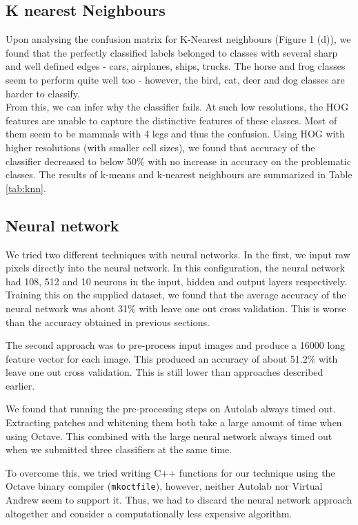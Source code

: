 \documentclass{article} %
\begin{document}
\subsection{K nearest Neighbours}
    Upon analysing the confusion matrix for K-Nearest neighbours (Figure 1 (d)), we found that the perfectly classified labels belonged to classes with several sharp and well defined edges - cars, airplanes, ships, trucks. The horse and frog classes seem to perform quite well too - however, the bird, cat, deer and dog classes are harder to classify.\\

        From this, we can infer why the classifier fails. At such low resolutions, the HOG features are unable to capture the distinctive features of these classes. Most of them seem to be mammals with 4 legs and thus the confusion. Using HOG with higher resolutions (with smaller cell sizes), we found that accuracy of the classifier decreased to below 50\% with no increase in accuracy on the problematic classes. The results of k-means and k-nearest neighbours are summarized in Table \ref{tab:knn}.
        
    \subsection{Neural network} %
    \label{sub:Results}
        We tried two different techniques with neural networks. In the first, we input raw pixels directly into the neural network. In this configuration, the neural network had 108, 512 and 10 neurons in the input, hidden and output layers respectively. Training this on the supplied dataset, we found that the average accuracy of the neural network was about 31\% with leave one out cross validation. This is worse than the accuracy obtained in previous sections.

        The second approach was to pre-process input images and produce a 16000 long feature vector for each image. This produced an accuracy of about 51.2\% with leave one out cross validation. This is still lower than approaches described earlier.

        We found that running the pre-processing steps on Autolab always timed out. Extracting patches and whitening them both take a large amount of time when using Octave. This combined with the large neural network always timed out when we submitted three classifiers at the same time.

        To overcome this, we tried writing C++ functions for our technique using the Octave binary compiler (\texttt{mkoctfile}), however, neither Autolab nor Virtual Andrew seem to support it. Thus, we had to discard the neural network approach altogether and consider a computationally less expensive algorithm.
\end{document}
